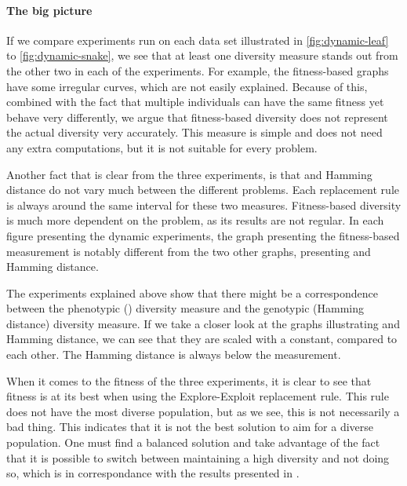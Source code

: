 

\paragraph{The big picture} If we compare experiments run on each data set illustrated in \cref{fig:dynamic-leaf} to \cref{fig:dynamic-snake}, we see that at least one diversity measure stands out from the other two in each of the experiments. For example, the fitness-based graphs have some irregular curves, which are not easily explained. Because of this, combined with the fact that multiple individuals can have the same fitness yet behave very differently, we argue that fitness-based diversity does not represent the actual diversity very accurately. This measure is simple and does not need any extra computations, but it is not suitable for every problem. 

Another fact that is clear from the three experiments, is that \dia{} and Hamming distance do not vary much between the different problems. Each replacement rule is always around the same interval for these two measures. Fitness-based diversity is much more dependent on the problem, as its results are not regular. In each figure presenting the dynamic experiments, the graph presenting the fitness-based measurement is notably different from the two other graphs, presenting \dia{} and Hamming distance.

The experiments explained above show that there might be a correspondence between the phenotypic (\dia{}) diversity measure and the genotypic (Hamming distance) diversity measure. If we take a closer look at the graphs illustrating \dia{} and Hamming distance, we can see that they are scaled with a constant, compared to each other. The Hamming distance is always below the \dia{} measurement.%

When it comes to the fitness of the three experiments, it is clear to see that fitness is at its best when using the Explore-Exploit replacement rule. This rule does not have the most diverse population, but as we see, this is not necessarily a bad thing. This indicates that it is not the best solution to aim for a  diverse population. One must find a balanced solution and take advantage of the fact that it is possible to switch between maintaining a high diversity and not doing so, which is in correspondance with the results presented in \cite{Darwen00doesextra}.

